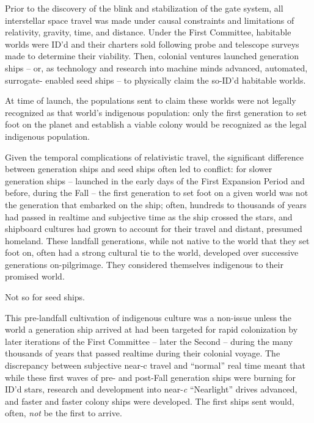 Prior to the discovery of the blink and stabilization of the gate system, all interstellar space travel
was made under causal constraints and limitations of relativity, gravity, time, and distance. Under
the First Committee, habitable worlds were ID’d and their charters sold following probe and
telescope surveys made to determine their viability. Then, colonial ventures launched generation
ships -- or, as technology and research into machine minds advanced,  automated, surrogate-
enabled seed ships -- to physically claim the so-ID’d habitable worlds.

At time of launch, the populations sent to claim these worlds were not legally recognized as that
world’s indigenous population: only the first generation to set foot on the planet and establish a
viable colony would be recognized as the legal indigenous population.

Given the temporal complications of relativistic travel, the significant difference between
generation ships and seed ships often led to conflict: for slower generation ships -- launched in
the early days of the First Expansion Period and before, during the Fall -- the first generation to
set foot on a given world was not the generation that embarked on the ship; often, hundreds to
thousands of years had passed in realtime and subjective time as the ship crossed the stars, and
shipboard cultures had grown to account for their travel and distant, presumed homeland. These
landfall generations, while not native to the world that they set foot on, often had a strong
cultural tie to the world, developed over successive generations on-pilgrimage. They considered
themselves indigenous to their promised world.

Not so for seed ships.

This pre-landfall cultivation of indigenous culture was a non-issue unless the world a generation
ship arrived at had been targeted for rapid colonization by later iterations of the First Committee
-- later the Second -- during the many thousands of years that passed realtime during their
colonial voyage. The discrepancy between subjective near-c travel and ``normal'' real time meant
that while these first waves of pre- and post-Fall generation ships were burning for ID’d stars,
research and development into near-\textit{c} ``Nearlight'' drives advanced, and faster and faster colony
ships were developed. The first ships sent would, often, \textit{not} be the first to arrive.

